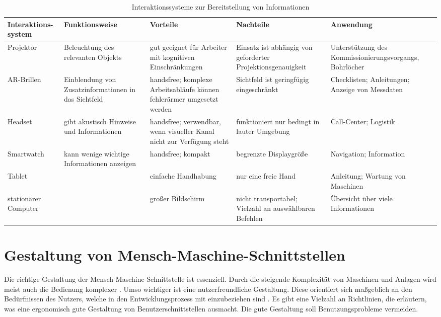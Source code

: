 \begin{sidewaystable}[ph!]
\caption{Interaktionssysteme zur Bereitstellung von Informationen}
\begin{tabular}{p{}|p{}|p{}|p{}|p{}}
	\textbf{Interaktions-system} & \textbf{Funktionsweise} & \textbf{Vorteile} & \textbf{Nachteile} & \textbf{Anwendung} \\
	\hline
	Projektor & Beleuchtung des relevanten Objekts & gut geeignet für Arbeiter mit kognitiven Einschränkungen & Einsatz ist abhängig von geforderter Projektionsgenauigkeit & Unterstützung des Kommissionierungsvorgangs, Bohrlöcher \\
	\hline
	AR-Brillen & Einblendung von Zusatzinformationen in das Sichtfeld & handsfree; komplexe Arbeitsabläufe können fehlerärmer umgesetzt werden & Sichtfeld ist geringfügig eingeschränkt & Checklisten; Anleitungen; Anzeige von Messdaten \\
	\hline
	Headset & gibt akustisch Hinweise und Informationen & handsfree; verwendbar, wenn visueller Kanal nicht zur Verfügung steht & funktioniert nur bedingt in lauter Umgebung & Call-Center; Logistik \\
	\hline
	Smartwatch & kann wenige wichtige Informationen anzeigen & handsfree; kompakt & begrenzte Displaygröße & Navigation; Information \\
	\hline
	Tablet & & einfache Handhabung & nur eine freie Hand & Anleitung; Wartung von Maschinen\\
	\hline
	stationärer Computer & & großer Bildschirm & nicht transportabel; Vielzahl an auswählbaren Befehlen & Übersicht über viele Informationen\\
\end{tabular}
\label{tab:Interaktionssystem}
\end{sidewaystable}

\section{Gestaltung von Mensch-Maschine-Schnittstellen}
Die richtige Gestaltung der Mensch-Maschine-Schnittstelle ist essenziell. Durch die steigende Komplexität von Maschinen und Anlagen wird meist auch die Bedienung komplexer \cite{Zuhlke2012}. Umso wichtiger ist eine nutzerfreundliche Gestaltung. Diese orientiert sich maßgeblich an den Bedürfnissen des Nutzers, welche in den Entwicklungsprozess mit einzubeziehen sind \cite{Heinecke2012, Zuhlke2012}. Es gibt eine Vielzahl an Richtlinien, die erläutern, was eine ergonomisch gute Gestaltung von Benutzerschnittstellen ausmacht. Die gute Gestaltung soll Benutzungsprobleme vermeiden.

